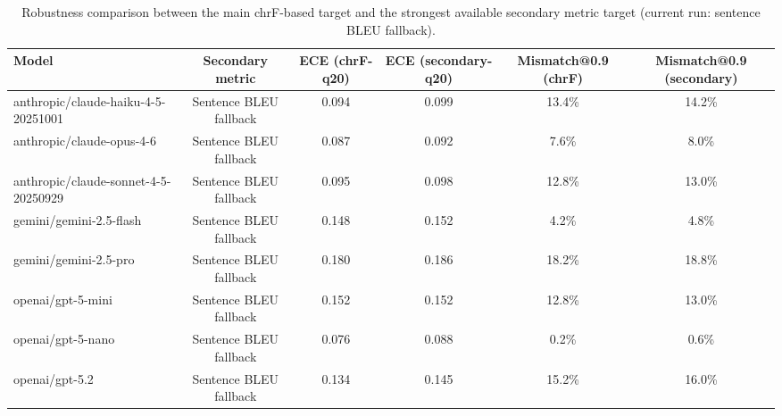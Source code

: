 \begin{table}[t]
\centering
\small
\begin{tabular}{lccccc}
\toprule
Model & Secondary metric & ECE (chrF-q20) & ECE (secondary-q20) & Mismatch@0.9 (chrF) & Mismatch@0.9 (secondary) \\
\midrule
anthropic/claude-haiku-4-5-20251001 & Sentence BLEU fallback & 0.094 & 0.099 & 13.4\% & 14.2\% \\
anthropic/claude-opus-4-6 & Sentence BLEU fallback & 0.087 & 0.092 & 7.6\% & 8.0\% \\
anthropic/claude-sonnet-4-5-20250929 & Sentence BLEU fallback & 0.095 & 0.098 & 12.8\% & 13.0\% \\
gemini/gemini-2.5-flash & Sentence BLEU fallback & 0.148 & 0.152 & 4.2\% & 4.8\% \\
gemini/gemini-2.5-pro & Sentence BLEU fallback & 0.180 & 0.186 & 18.2\% & 18.8\% \\
openai/gpt-5-mini & Sentence BLEU fallback & 0.152 & 0.152 & 12.8\% & 13.0\% \\
openai/gpt-5-nano & Sentence BLEU fallback & 0.076 & 0.088 & 0.2\% & 0.6\% \\
openai/gpt-5.2 & Sentence BLEU fallback & 0.134 & 0.145 & 15.2\% & 16.0\% \\
\bottomrule
\end{tabular}
\caption{Robustness comparison between the main chrF-based target and the strongest available secondary metric target (current run: sentence BLEU fallback).}
\label{tab:metric_robustness}
\end{table}
